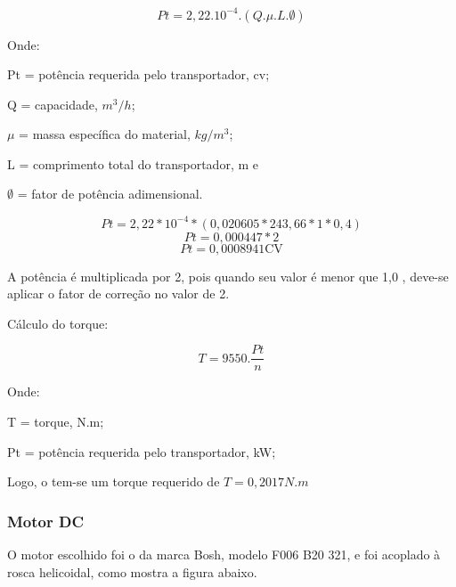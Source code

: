 \begin{equation}
Pt = 2,22.10^{-4}.(Q.\mu.L.\emptyset)
\end{equation}

Onde:

Pt = potência requerida pelo transportador, cv;

Q = capacidade, $m^3/h$;

$\mu$ = massa específica do material, $kg/m^3$;

L = comprimento total do transportador, m e

$\emptyset$ = fator de potência adimensional.


\begin{equation}
Pt = 2,22*10^{-4}*(0,020605*243,66*1*0,4)
\end{equation}
\begin{equation}
Pt = 0,000447*2
\end{equation}
\begin{equation}
Pt = 0,0008941 \text{CV}
\end{equation}


A potência é multiplicada por 2, pois quando seu valor é menor que 1,0 , deve-se aplicar o fator de correção no valor de 2.

Cálculo do torque:

\begin{equation}
T=9550.\frac{Pt}{n}
\end{equation}

Onde:

T = torque, N.m;

Pt = potência requerida pelo transportador, kW;

Logo, o tem-se um torque requerido de $T=0,2017N.m$

\subsubsection{Motor DC}

O motor escolhido foi o da marca Bosh, modelo F006 B20 321, e foi acoplado à rosca helicoidal, como mostra a figura abaixo.

